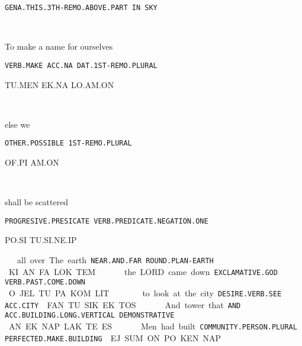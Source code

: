 {{\tt GENA.THIS.3TH-REMO.ABOVE.PART	IN	SKY }

\ta\es\aj\ef\pu~		\Atlanin	\som 
\drie

  

To make 	a name 		for ourselves		 

{\tt VERB.MAKE	ACC.NA		DAT.1ST-REMO.PLURAL	 }

TU.MEN	EK.NA		LO.AM.ON 

\tu\men~	\ek\na~		\lo\am\on 
\drie

 

else 			we 

{\tt OTHER.POSSIBLE	1ST-REMO.PLURAL }

OF.PI			AM.ON 

\of\Atlanpi ~ \am\on
\drie
 

shall be			    scattered			

{\tt PROGRESIVE.PRESICATE    VERB.PREDICATE.NEGATION.ONE        }

PO.SI			     TU.SI.NE.IP		 

\po\si~\am\om
\drie 

all over			The earth 

{\tt NEAR.AND.FAR		ROUND.PLAN-EARTH }

KI.AN.FA		LOK.TEM 

\ki\an\fa ~ \lok\tem
\drie 
 

the LORD 		came down 			

{\tt EXCLAMATIVE.GOD         VERB.PAST.COME.DOWN		}

O.JEL			TU.PA.KOM.LIT			 

\Atlano\jel ~ \tu\pa\kom\lit 
\drie 

to look			at the city 

{\tt DESIRE.VERB.SEE	ACC.CITY }

FAN.TU.SIK		EK.TOS 

\fan\tu\sik ~ \ek\tos
\drie 
  

And 	tower 				that 			 

{\tt AND	ACC.BUILDING.LONG.VERTICAL	DEMONSTRATIVE	 }

AN	EK.NAP.LAK.TE			ES			 

\an~\ek\nap\lak\te ~\es
 

Men				had built 

{\tt COMMUNITY.PERSON.PLURAL	PERFECTED.MAKE.BUILDING }

EJ.SUM.ON			PO.KEN.NAP 

\ej\Atlansum\on ~ \po\ken\nap
  
\drie 

}
